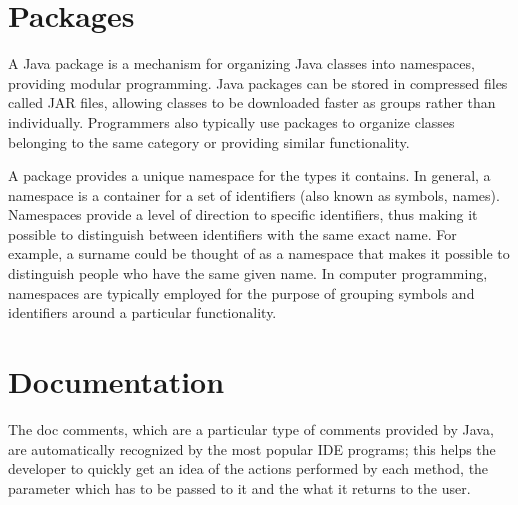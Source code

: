 \section{Packages}\label{sec:package}
A Java package is a mechanism for organizing Java classes into namespaces, providing modular programming. Java packages can be stored in compressed files called JAR files, allowing classes to be downloaded faster as groups rather than individually. Programmers also typically use packages to organize classes belonging to the same category or providing similar functionality.

A package provides a unique namespace for the types it contains.
In general, a namespace is a container for a set of identifiers (also known as symbols, names). Namespaces provide a level of direction to specific identifiers, thus making it possible to distinguish between identifiers with the same exact name. For example, a surname could be thought of as a namespace that makes it possible to distinguish people who have the same given name. In computer programming, namespaces are typically employed for the purpose of grouping symbols and identifiers around a particular functionality.

\section{Documentation}
The doc comments, which are a particular type of comments provided by Java, are automatically recognized by the most popular IDE programs; this helps the developer to quickly get an idea of the actions performed by each method, the parameter which has to be passed to it and the what it returns to the user.

%
